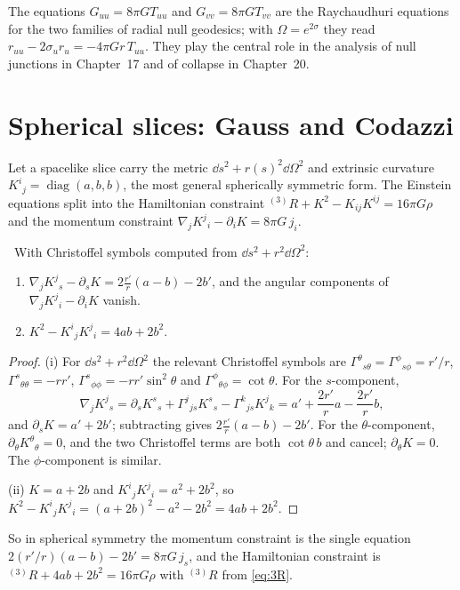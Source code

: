 The equations $G_{uu}=8\pi GT_{uu}$ and $G_{vv}=8\pi GT_{vv}$ are the Raychaudhuri equations for the two families of radial null geodesics; with $\Omega=e^{2\sigma}$ they read $r_{uu}-2\sigma_ur_u=-4\pi Gr\,T_{uu}$. They play the central role in the analysis of null junctions in Chapter~17 and of collapse in Chapter~20.

\section{Spherical slices: Gauss and Codazzi}

Let a spacelike slice carry the metric $\dd s^2+r(s)^2\dd\Omega^2$ and extrinsic curvature $K^i{}_j=\operatorname{diag}(a,b,b)$, the most general spherically symmetric form. The Einstein equations split into the Hamiltonian constraint ${}^{(3)}R+K^2-K_{ij}K^{ij}=16\pi G\rho$ and the momentum constraint $\nabla_jK^j{}_i-\partial_iK=8\pi G\,j_i$.

\begin{proposition}\label{prop:codazzi}\ver\
With Christoffel symbols computed from $\dd s^2+r^2\dd\Omega^2$:
\begin{enumerate}[label=(\roman*)]
\item $\nabla_jK^j{}_s-\partial_sK=2\frac{r'}{r}(a-b)-2b'$, and the angular components of $\nabla_jK^j{}_i-\partial_iK$ vanish.
\item $K^2-K^i{}_jK^j{}_i=4ab+2b^2$.
\end{enumerate}
\end{proposition}
\begin{proof}
(i) For $\dd s^2+r^2\dd\Omega^2$ the relevant Christoffel symbols are $\Gamma^\theta{}_{s\theta}=\Gamma^\phi{}_{s\phi}=r'/r$, $\Gamma^s{}_{\theta\theta}=-rr'$, $\Gamma^s{}_{\phi\phi}=-rr'\sin^2\theta$ and $\Gamma^\phi{}_{\theta\phi}=\cot\theta$. For the $s$-component,
\[
\nabla_jK^j{}_s=\partial_sK^s{}_s+\Gamma^j{}_{js}K^s{}_s-\Gamma^k{}_{js}K^j{}_k=a'+\frac{2r'}ra-\frac{2r'}rb,
\]
and $\partial_sK=a'+2b'$; subtracting gives $2\frac{r'}r(a-b)-2b'$. For the $\theta$-component, $\partial_\theta K^\theta{}_\theta=0$, and the two Christoffel terms are both $\cot\theta\,b$ and cancel; $\partial_\theta K=0$. The $\phi$-component is similar.

(ii) $K=a+2b$ and $K^i{}_jK^j{}_i=a^2+2b^2$, so $K^2-K^i{}_jK^j{}_i=(a+2b)^2-a^2-2b^2=4ab+2b^2$.
\end{proof}


So in spherical symmetry the momentum constraint is the single equation $2(r'/r)(a-b)-2b'=8\pi G\,j_s$, and the Hamiltonian constraint is ${}^{(3)}R+4ab+2b^2=16\pi G\rho$ with ${}^{(3)}R$ from \eqref{eq:3R}.

